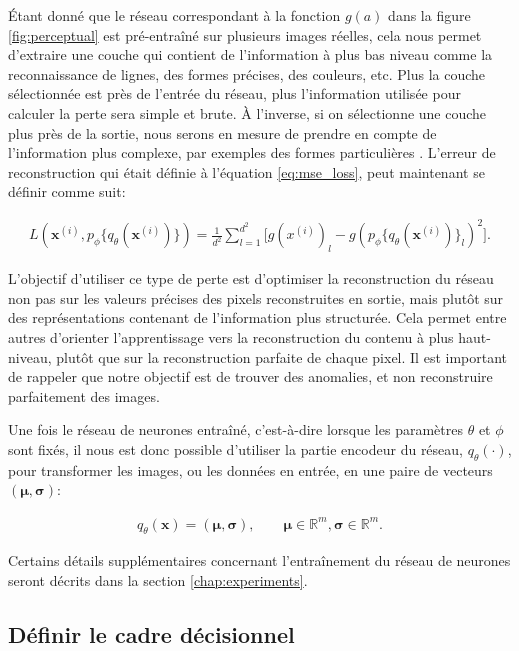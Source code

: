 Étant donné que le réseau correspondant à la fonction $g(a)$ dans la figure \ref{fig:perceptual} est pré-entraîné sur plusieurs images réelles, cela nous permet d'extraire une couche qui contient de l'information à plus bas niveau comme la reconnaissance de lignes, des formes précises, des couleurs, etc. Plus la couche sélectionnée est près de l'entrée du réseau, plus l'information utilisée pour calculer la perte sera simple et brute. À l'inverse, si on sélectionne une couche plus près de la sortie, nous serons en mesure de prendre en compte de l'information plus complexe, par exemples des formes particulières \citep{Johnson2016Perceptual}. L'erreur de reconstruction qui était définie à l'équation \ref{eq:mse_loss}, peut maintenant se définir comme suit:

\begin{gather} \label{eq:perceptual_loss}
L(\boldsymbol{x}^{(i)}, p_\phi\{q_\theta(\boldsymbol{x}^{(i)})\}) = \frac{1}{d^2} \sum_{l=1}^{d^2} \Big[g(x^{(i)})_{l} - g(p_\phi\{q_\theta(\boldsymbol{x}^{(i)})\}_{l})^2\Big].
\end{gather}

L'objectif d'utiliser ce type de perte est d'optimiser la reconstruction du réseau non pas sur les valeurs précises des pixels reconstruites en sortie, mais plutôt sur des représentations contenant de l'information plus structurée. Cela permet entre autres d'orienter l'apprentissage vers la reconstruction du contenu à plus haut-niveau, plutôt que sur la reconstruction parfaite de chaque pixel. Il est important de rappeler que notre objectif est de trouver des anomalies, et non reconstruire parfaitement des images.

Une fois le réseau de neurones entraîné, c'est-à-dire lorsque les paramètres $\theta$ et $\phi$ sont fixés, il nous est donc possible d'utiliser la partie encodeur du réseau, $q_{\theta}(\cdot) $, pour transformer les images, ou les données en entrée, en une paire de vecteurs $(\boldsymbol{\mu}, \boldsymbol{\sigma})$:

\begin{gather}  \label{eq:encodeur}
q_{\theta}(\boldsymbol{x}) = (\boldsymbol{\mu}, \boldsymbol{\sigma}), \qquad \boldsymbol{\mu} \in \mathbb{R}^m, \boldsymbol{\sigma} \in \mathbb{R}^m.
\end{gather}

Certains détails supplémentaires concernant l'entraînement du réseau de neurones seront décrits dans la section \ref{chap:experiments}.


\subsection{Définir le cadre décisionnel}

